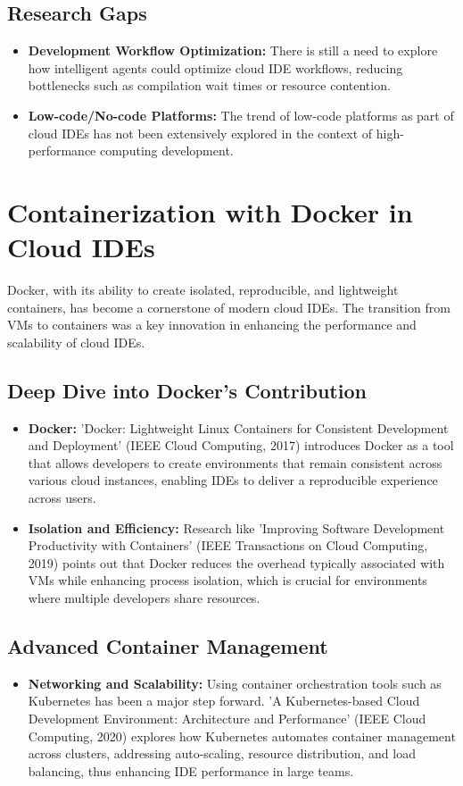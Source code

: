 \documentclass[12pt,a4paper,final]{report}
\begin{document}
\subsection{Research Gaps}
\begin{itemize}
    \item \textbf{Development Workflow Optimization:} There is still a need to explore how intelligent agents could optimize cloud IDE workflows, reducing bottlenecks such as compilation wait times or resource contention.
    \item \textbf{Low-code/No-code Platforms:} The trend of low-code platforms as part of cloud IDEs has not been extensively explored in the context of high-performance computing development.
\end{itemize}

\section{Containerization with Docker in Cloud IDEs}

Docker, with its ability to create isolated, reproducible, and lightweight containers, has become a cornerstone of modern cloud IDEs. The transition from VMs to containers was a key innovation in enhancing the performance and scalability of cloud IDEs.

\subsection{Deep Dive into Docker’s Contribution}
\begin{itemize}
    \item \textbf{Docker:} 'Docker: Lightweight Linux Containers for Consistent Development and Deployment' (IEEE Cloud Computing, 2017) introduces Docker as a tool that allows developers to create environments that remain consistent across various cloud instances, enabling IDEs to deliver a reproducible experience across users.
    \item \textbf{Isolation and Efficiency:} Research like 'Improving Software Development Productivity with Containers' (IEEE Transactions on Cloud Computing, 2019) points out that Docker reduces the overhead typically associated with VMs while enhancing process isolation, which is crucial for environments where multiple developers share resources.
\end{itemize}

\subsection{Advanced Container Management}
\begin{itemize}
    \item \textbf{Networking and Scalability:} Using container orchestration tools such as Kubernetes has been a major step forward. 'A Kubernetes-based Cloud Development Environment: Architecture and Performance' (IEEE Cloud Computing, 2020) explores how Kubernetes automates container management across clusters, addressing auto-scaling, resource distribution, and load balancing, thus enhancing IDE performance in large teams.
\end{itemize}
\end{document}
